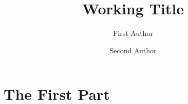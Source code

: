\documentclass[a4paper]{memoir}
\title{Working Title}
\author
{
    First Author
    \and
    Second Author
}
\begin{document}
    \frontmatter        %

    \begin{titlingpage}
        \maketitle
    \end{titlingpage}

    
    

    \tableofcontents    %
    \listoffigures
    \listoftables

    \mainmatter         %

    

    \part{The First Part}

    
    
    

    \appendix           %
    \appendixpage       %

    
    

    \backmatter         %

    \printbibliography
\end{document}
